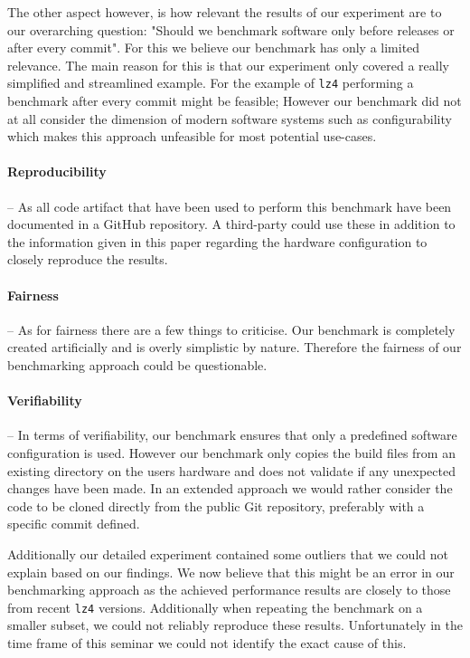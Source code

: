 \documentclass[	runningheads,
				a4paper]{llncs}
\begin{document}
	The other aspect however, is how relevant the results of our experiment are to our overarching question: "Should we benchmark software only before releases or after every commit". For this we believe our benchmark has only a limited relevance. The main reason for this is that our experiment only covered a really simplified and streamlined example. For the example of \texttt{lz4} performing a benchmark after every commit might be feasible; However our benchmark did not at all consider the dimension of modern software systems such as configurability which makes this approach unfeasible for most potential use-cases.

\paragraph{Reproducibility} -- As all code artifact that have been used to perform this benchmark have been documented in a GitHub repository. A third-party could use these in addition to the information given in this paper regarding the hardware configuration to closely reproduce the results.

\paragraph{Fairness} -- As for fairness there are a few things to criticise. Our benchmark is completely created artificially and is overly simplistic by nature. Therefore the fairness of our benchmarking approach could be questionable.

\paragraph{Verifiability} -- In terms of verifiability, our benchmark ensures that only a predefined software configuration is used. However our benchmark only copies the build files from an existing directory on the users hardware and does not validate if any unexpected changes have been made. In an extended approach we would rather consider the code to be cloned directly from the public Git repository, preferably with a specific commit defined.

Additionally our detailed experiment contained some outliers that we could not explain based on our findings. We now believe that this might be an error in our benchmarking approach as the achieved performance results are closely to those from recent \texttt{lz4} versions. Additionally when repeating the benchmark on a smaller subset, we could not reliably reproduce these results. Unfortunately in the time frame of this seminar we could not identify the exact cause of this.
\end{document}
